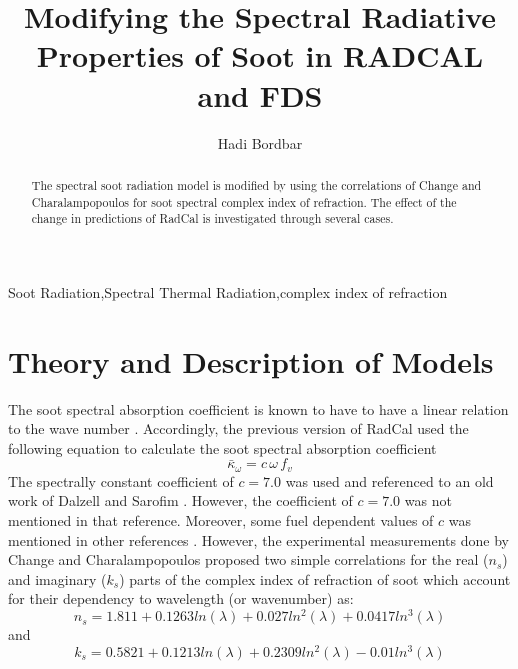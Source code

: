 \documentclass[3p]{elsarticle}
\begin{document}
	
	\begin{frontmatter}

\title{Modifying the Spectral Radiative Properties of Soot in RADCAL and FDS}


\author[aalto]{Hadi Bordbar}



\address[aalto]{Department of Civil Engineering, Aalto University, Rakentajanaukio 4a, Espoo, 02150, Finland}


\begin{abstract}
The spectral soot radiation model is modified by using the correlations of Change and Charalampopoulos \cite{ChangeCharalampopoulos1990} for soot  spectral complex index of refraction. The effect of the change in predictions of RadCal is investigated through several cases. 
\end{abstract}

\begin{keyword}
Soot Radiation\sep Spectral Thermal Radiation\sep complex index of refraction
\end{keyword}

\end{frontmatter}


\allowdisplaybreaks

\section{Theory and Description of Models}\label{Cap:Introduction}
The soot spectral absorption coefficient is known to have to have a linear relation to the wave number \cite{modest2013radiative}. Accordingly, the previous version of RadCal used the following equation to calculate the soot spectral absorption coefficient
\begin{equation}
{\bar \kappa _\omega } = c\,\omega \,{f_v}
\label{Eq: Contant_C_Kappa}
\end{equation}
The spectrally constant coefficient of \(c = 7.0\) was used and referenced to an old work of Dalzell and Sarofim \cite{Dalzell1969_soot}. However, the coefficient of \(c = 7.0\) was not mentioned in that reference. Moreover, some fuel dependent values of \(c\) was mentioned in other references \cite{cassol2014application, YAGI1961288}. However, the experimental measurements done by Change and  Charalampopoulos \cite{ChangeCharalampopoulos1990} proposed two simple correlations for the real (\(n_s\)) and imaginary (\(k_s\)) parts of the complex index of refraction of soot which account for their dependency to wavelength (or wavenumber) as:
\begin{equation}
n_s=1.811+0.1263 ln(\lambda)+0.027ln^2(\lambda)+0.0417ln^3(\lambda)
\label{Eq:n_lambda}	
\end{equation}
and
\begin{equation}
k_s=0.5821+0.1213 ln(\lambda)+0.2309ln^2(\lambda)-0.01ln^3(\lambda)
\label{Eq:k_lambda}	
\end{equation}
\end{document}
